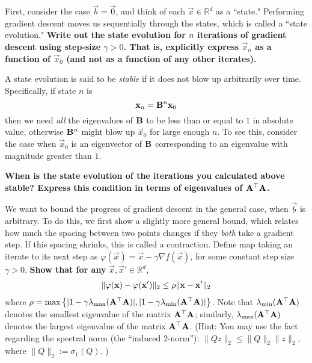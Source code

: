 \documentclass[11pt]{article}
\begin{document}
\begin{Parts}

\Part First, consider the case $\vec{b} = \vec{0}$, and think of each $\vec{x} \in \mathbb{R}^d$
as a ``state." Performing gradient descent moves us sequentially through the states,
which is called a ``state evolution."
{\bf Write out the state
evolution for $n$ iterations of gradient descent using step-size
$\gamma > 0$. That is, explicitly express $\vec{x}_n$ as a function of $\vec{x}_0$ (and not as a function of any other iterates).}



\Part A state evolution is said to be \emph{stable} if it does not blow up arbitrarily
over time. Specifically,
if state $n$ is $$\boldsymbol{\mathbf{x}}_n = \mathbf{B}^n\boldsymbol{\mathbf{x}}_0$$ then we need \emph{all} the eigenvalues
of $\mathbf{B}$ to be less than or equal to $1$ in absolute value, otherwise $\mathbf{B}^n$
might blow up $\vec{x}_0$ for large enough $n$. To see this, consider the case when $\vec{x}_0$ is an eigenvector of $\mathbf{B}$ corresponding to an eigenvalue with magnitude greater than $1$.

{\bf When is the state evolution of the iterations you calculated
above stable? Express this condition in terms of eigenvalues of $\mathbf{A}^\top \mathbf{A}$.}



\Part We want to bound the progress of gradient descent in
the general case, when $\vec{b}$ is arbitrary. To do this, we first show a
slightly more general bound,
which relates how much the spacing between two points changes if they
\textit{both} take a gradient step. If this spacing shrinks, this is called a contraction.
Define map taking an iterate to its next step as $\varphi(\vec{x}) = \vec{x} - \gamma \nabla f(\vec{x})$,
for some constant step size $\gamma > 0$.
\textbf{Show that for any} $\vec{x},\vec{x}' \in \mathbb{R}^d$,
\begin{align*}
\| \varphi(\boldsymbol{\mathbf{x}}) - \varphi(\boldsymbol{\mathbf{x}}') \|_2 \leq \rho \| \boldsymbol{\mathbf{x}} - \boldsymbol{\mathbf{x}}'\|_2
\end{align*}
where $\rho = \max \left\{ | 1 - \gamma \lambda_{\max}(\mathbf{A}^\top\mathbf{A}) |,
| 1 -\gamma \lambda_{\min}(\mathbf{A}^\top\mathbf{A}) | \right\}$.
Note that $\lambda_{\min}(\mathbf{A}^\top\mathbf{A})$
denotes the smallest eigenvalue of the matrix $\mathbf{A}^\top\mathbf{A}$; similarly,
$\lambda_{\max}(\mathbf{A}^\top\mathbf{A})$ denotes the largest eigenvalue of the matrix
$\mathbf{A}^\top\mathbf{A}$. (Hint: You may use the fact regarding the spectral norm (the ``induced 2-norm''): $\|Qz\|_2 \leq \|Q\|_2\|z\|_2$, where $\|Q\|_2 := \sigma_1(Q)$. )







\end{Parts}
\end{document}
